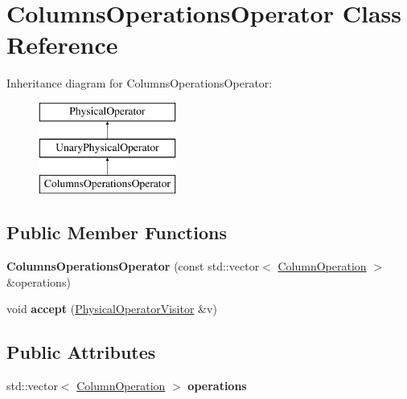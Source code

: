 \hypertarget{class_columns_operations_operator}{\section{Columns\+Operations\+Operator Class Reference}
\label{class_columns_operations_operator}
}
Inheritance diagram for Columns\+Operations\+Operator\+:\begin{figure}[H]
\begin{center}
\leavevmode
\includegraphics[height=3.000000cm]{class_columns_operations_operator}
\end{center}
\end{figure}
\subsection*{Public Member Functions}
\begin{DoxyCompactItemize}
\item 
\hypertarget{class_columns_operations_operator_a19cb4f96df418cd1a94a4906da06e20d}{{\bfseries Columns\+Operations\+Operator} (const std\+::vector$<$ \hyperlink{class_column_operation}{Column\+Operation} $>$ \&operations)}\label{class_columns_operations_operator_a19cb4f96df418cd1a94a4906da06e20d}

\item 
\hypertarget{class_columns_operations_operator_a5d40e806cb9dbd2969b45c28d7729f76}{void {\bfseries accept} (\hyperlink{class_physical_operator_visitor}{Physical\+Operator\+Visitor} \&v)}\label{class_columns_operations_operator_a5d40e806cb9dbd2969b45c28d7729f76}

\end{DoxyCompactItemize}
\subsection*{Public Attributes}
\begin{DoxyCompactItemize}
\item 
\hypertarget{class_columns_operations_operator_ae2384aeda586f5c60013dbe0cb5a3030}{std\+::vector$<$ \hyperlink{class_column_operation}{Column\+Operation} $>$ {\bfseries operations}}\label{class_columns_operations_operator_ae2384aeda586f5c60013dbe0cb5a3030}

\end{DoxyCompactItemize}


